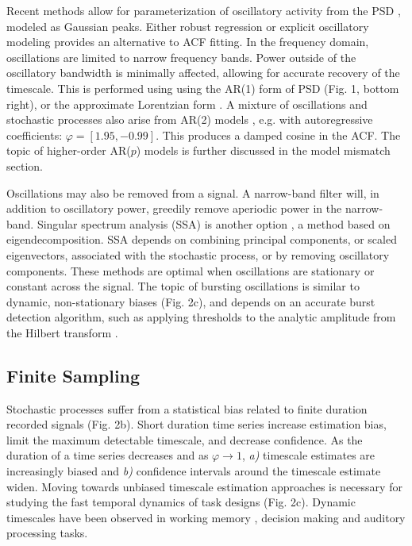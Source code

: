 \documentclass[pdflatex,sn-mathphys-num]{sn-jnl}
\begin{document}
Recent methods allow for parameterization of oscillatory activity from the PSD \cite{donoghue_parameterizing_2020}, modeled as Gaussian peaks. Either robust regression or explicit oscillatory modeling provides an alternative to ACF fitting.  In the frequency domain, oscillations are limited to narrow frequency bands. Power outside of the oscillatory bandwidth is minimally affected, allowing for accurate recovery of the timescale. This is performed using using the AR(1) form of PSD (Fig. 1, bottom right), or the approximate Lorentzian form \cite{gao_neuronal_2020}. A mixture of oscillations and stochastic processes also arise from AR(2) models \cite{stralrowski_charts_1970}, e.g. with autoregressive coefficients: $\varphi = [1.95, -0.99]$. This produces a damped cosine in the ACF. The topic of higher-order AR($p$) models is further discussed in the model mismatch section. 

Oscillations may also be removed from a signal. A narrow-band filter will, in addition to oscillatory power, greedily remove aperiodic power in the narrow-band. Singular spectrum analysis (SSA) is another option \cite{hassani_singular_2021}, a method based on eigendecomposition. SSA depends on combining principal components, or scaled eigenvectors, associated with the stochastic process, or by removing oscillatory components. These methods are optimal when oscillations are stationary or constant across the signal. The topic of bursting oscillations is similar to dynamic, non-stationary biases (Fig. 2c), and depends on an accurate burst detection algorithm, such as applying thresholds to the analytic amplitude from the Hilbert transform \cite{feingold_bursts_2015}. 

\subsection{Finite Sampling}

Stochastic processes suffer from a statistical bias related to finite duration recorded signals (Fig. 2b). Short duration time series increase estimation bias, limit the maximum detectable timescale, and decrease confidence. As the duration of a time series decreases and as $\varphi \to 1$, \textit{a)} timescale estimates are increasingly biased and \textit{b)} confidence intervals around the timescale estimate widen. Moving towards unbiased timescale estimation approaches is necessary for studying the fast temporal dynamics of task designs (Fig. 2c). Dynamic timescales have been observed in working memory \cite{wasmuht_intrinsic_2018, gao_neuronal_2020}, decision making \cite{ganupuru_flexibility_2019} and auditory processing \cite{chien_constructing_2020} tasks. 
\end{document}
